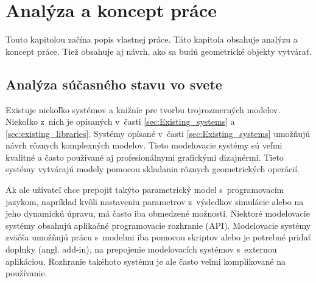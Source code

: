 





\chapter{Analýza a koncept práce}
Touto kapitolou začína popis vlastnej práce.
Táto kapitola obsahuje analýzu a koncept práce. Tiež obsahuje aj návrh, ako sa budú geometrické objekty vytvárať.

\section{Analýza súčasného stavu vo svete}
Existuje niekoľko systémov a knižníc pre tvorbu trojrozmerných modelov. Niekoľko z~nich je opísaných v~časti \ref{sec:Existing_systems} a \ref{sec:existing_libraries}. Systémy opísané v~časti \ref{sec:Existing_systems} umožňujú návrh rôznych komplexných modelov. Tieto modelovacie systémy sú veľmi kvalitné a často používané aj profesionálnymi grafickými dizajnérmi. Tieto systémy vytvárajú modely pomocou skladania rôznych geometrických operácií. 

Ak ale užívateľ chce prepojiť takýto parametrický model s~programovacím jazykom, napríklad kvôli nastaveniu parametrov z~výsledkov simulácie  alebo na jeho dynamickú ú\-pravu, má často iba obmedzené možnosti. Niektoré modelovacie systémy obsahujú aplikačné pro\-gramovacie rozhranie (API). Modelovacie systémy zväčša umožňujú prácu s~modelmi iba pomocou skriptov alebo je potrebné pridať doplnky (angl. add-in), na prepojenie modelovacích systémov s~externou aplikáciou.
 Rozhranie takéhoto systému je ale často veľmi komplikované na používanie. 



